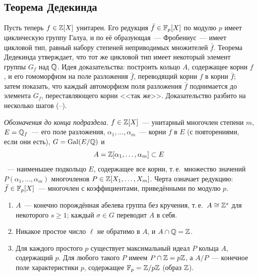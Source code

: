 \subsection*{Теорема Дедекинда}

Пусть теперь $f\in\mathbb Z[X]$ унитарен. Его редукция $\bar f\in\mathbb F_p[X]$ по модулю $p$ имеет циклическую группу Галуа, и по 
её образующая~--- Фробениус~--- имеет цикловой тип, равный набору степеней неприводимых множителей $\bar f$. Теорема
Дедекинда утверждает, что тот же цикловой тип имеет некоторый элемент группы $G_f$ над $\mathbb Q$. Идея доказательства:
построить кольцо $A$, содержащее корни $f$, и его гомоморфизм на поле разложения $\bar f$, переводящий корни $f$ в корни
$\bar f$; затем показать, что каждый автоморфизм поля разложения $\bar f$ поднимается до элемента $G_f$, переставляющего
корни <<так же>>. Доказательство разбито на несколько шагов (--).

\emph{Обозначения до конца подраздела.} $f\in\mathbb Z[X]$~--- унитарный многочлен степени $m$, $E=\mathbb Q_f$~--- его поле
разложения, $\alpha_1,\dots,\alpha_m$~--- корни $f$ в $E$ (с повторениями, если они есть), $G=\operatorname{Gal}(E/\mathbb Q)$ и
\[
A=\mathbb Z[\alpha_1,\dots,\alpha_m]\subset E
\]
~--- наименьшее подкольцо $E$, содержащее все корни, т.\,е.\ множество значений $P(\alpha_1,\dots,\alpha_m)$ многочленов
$P\in\mathbb Z[X_1,\dots,X_m]$. Черта означает редукцию: $\bar f\in\mathbb F_p[X]$~--- многочлен с коэффициентами, приведёнными по
модулю $p$.

\begin{lemma}[4.27b]
\begin{enumerate}[label=\textup{(\alph*)}]
\item $A$~--- конечно порождённая абелева группа без кручения, т.\,е.\ $A\cong\mathbb Z^s$ для некоторого $s\ge1$; каждый
$\sigma\in G$ переводит $A$ в себя.
\item Никакое простое число $\ell$ не обратимо в $A$, и $A\cap\mathbb Q=\mathbb Z$.
\item Для каждого простого $p$ существует максимальный идеал $P$ кольца $A$, содержащий $p$. Для любого такого $P$
имеем $P\cap\mathbb Z=p\mathbb Z$, а $A/P$~--- конечное поле характеристики $p$, содержащее $\mathbb F_p=\mathbb Z/p\mathbb Z$ (образ $\mathbb Z$).
\end{enumerate}
\end{lemma}


